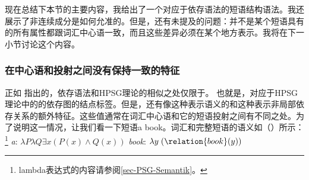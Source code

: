 现在总结下本节的主要内容，我给出了一个对应于依存语法的短语结构语法。我还展示了非连续成分是如何允准的。但是，还有未提及的问题：并不是某个短语具有的所有属性都跟词汇中心语一致，而且这些差异必须在某个地方表示。我将在下一小节讨论这个内容。

\subsubsection{在中心语和投射之间没有保持一致的特征}
\label{sec-dg-daughters-mothers}
\label{sec-dg-is-simpler}
%
正如 \citet{Oliva2003a}指出的，依存语法和HPSG理论的相似之处仅限于\headvsc。
也就是，对应于HPSG理论中的\headvsc 的依存图的结点标签。但是，还有像\contc 这种表示语义的和\slaschc 这种表示非局部依存关系的额外特征。这些值通常在词汇中心语和它的短语投射之间有不同之处。为了说明这一情况，让我们看一下短语a book。词汇和完整短语的语义如（）所示：\footnote{lambda表达式的内容请参阅\ref{sec-PSG-Semantik}。}
\eal
\ex \emph{a}: $\lambda P \lambda Q \exists x (P(x) \wedge Q(x))$
\ex \emph{book}: $\lambda y\;(\relation{book}(y))$
